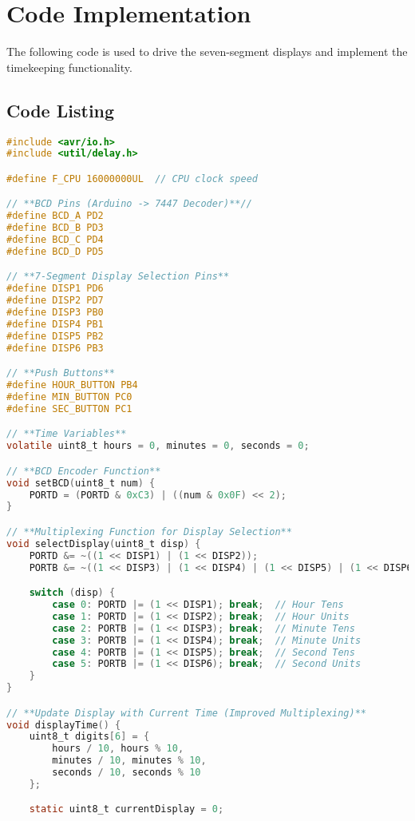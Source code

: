 \documentclass[a4paper,12pt]{article}
\theoremstyle{remark}
\begin{document}
\section{Code Implementation}
The following code is used to drive the seven-segment displays and implement the timekeeping functionality.

\subsection{Code Listing}
\begin{lstlisting}[language=C, basicstyle=\ttfamily, keywordstyle=\color{blue}, commentstyle=\color{gray}]
#include <avr/io.h>
#include <util/delay.h>

#define F_CPU 16000000UL  // CPU clock speed

// **BCD Pins (Arduino -> 7447 Decoder)**//
#define BCD_A PD2
#define BCD_B PD3
#define BCD_C PD4
#define BCD_D PD5

// **7-Segment Display Selection Pins**
#define DISP1 PD6
#define DISP2 PD7
#define DISP3 PB0
#define DISP4 PB1
#define DISP5 PB2
#define DISP6 PB3

// **Push Buttons**
#define HOUR_BUTTON PB4
#define MIN_BUTTON PC0
#define SEC_BUTTON PC1

// **Time Variables**
volatile uint8_t hours = 0, minutes = 0, seconds = 0;

// **BCD Encoder Function**
void setBCD(uint8_t num) {
    PORTD = (PORTD & 0xC3) | ((num & 0x0F) << 2);
}

// **Multiplexing Function for Display Selection**
void selectDisplay(uint8_t disp) {
    PORTD &= ~((1 << DISP1) | (1 << DISP2));
    PORTB &= ~((1 << DISP3) | (1 << DISP4) | (1 << DISP5) | (1 << DISP6));

    switch (disp) {
        case 0: PORTD |= (1 << DISP1); break;  // Hour Tens
        case 1: PORTD |= (1 << DISP2); break;  // Hour Units
        case 2: PORTB |= (1 << DISP3); break;  // Minute Tens
        case 3: PORTB |= (1 << DISP4); break;  // Minute Units
        case 4: PORTB |= (1 << DISP5); break;  // Second Tens
        case 5: PORTB |= (1 << DISP6); break;  // Second Units
    }
}

// **Update Display with Current Time (Improved Multiplexing)**
void displayTime() {
    uint8_t digits[6] = {
        hours / 10, hours % 10,
        minutes / 10, minutes % 10,
        seconds / 10, seconds % 10
    };

    static uint8_t currentDisplay = 0;
    

\end{lstlisting}
\end{document}

